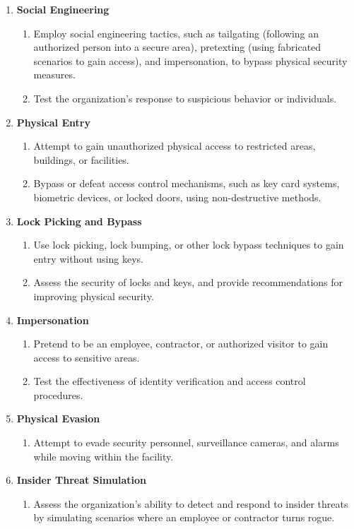 \begin{enumerate}
\item \textbf{Social Engineering}

\begin{enumerate}
\item Employ social engineering tactics, such as tailgating (following an authorized person into a secure area), pretexting (using fabricated scenarios to gain access), and impersonation, to bypass physical security measures.
\item Test the organization's response to suspicious behavior or individuals.
\end{enumerate}

\item \textbf{Physical Entry}
\begin{enumerate}
\item Attempt to gain unauthorized physical access to restricted areas, buildings, or facilities.
\item Bypass or defeat access control mechanisms, such as key card systems, biometric devices, or locked doors, using non-destructive methods.
\end{enumerate}

\item \textbf{Lock Picking and Bypass}
\begin{enumerate}
\item Use lock picking, lock bumping, or other lock bypass techniques to gain entry without using keys.
\item Assess the security of locks and keys, and provide recommendations for improving physical security.
\end{enumerate}

\item \textbf{Impersonation}
\begin{enumerate}
\item Pretend to be an employee, contractor, or authorized visitor to gain access to sensitive areas.
\item Test the effectiveness of identity verification and access control procedures.
\end{enumerate}

\item \textbf{Physical Evasion}
\begin{enumerate}
\item Attempt to evade security personnel, surveillance cameras, and alarms while moving within the facility.
\end{enumerate}

\item \textbf{Insider Threat Simulation}
\begin{enumerate}
\item Assess the organization's ability to detect and respond to insider threats by simulating scenarios where an employee or contractor turns rogue.
\end{enumerate}


\end{enumerate}
